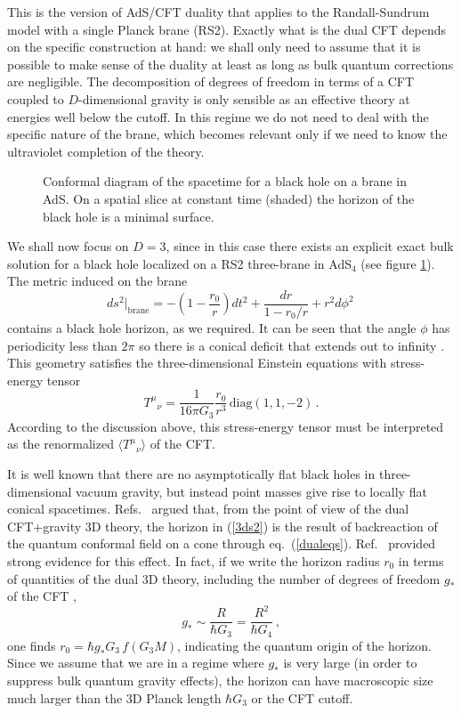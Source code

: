 \documentclass[12pt]{article}
\newcommand{\beq}{\begin{equation}}
\newcommand{\eeq}{\end{equation}}
\newcommand{\reef}[1]{(\ref{#1})}
\begin{document}
This is the version of AdS/CFT duality that applies to the
Randall-Sundrum model with a single Planck brane (RS2). Exactly what is
the dual CFT depends on the specific construction at hand: we shall only
need to assume that it is possible to make sense of the duality at least
as long as bulk quantum corrections are negligible. The decomposition of
degrees of freedom in terms of a CFT coupled to $D$-dimensional gravity
is only sensible as an effective theory at energies well below the
cutoff. In this regime we do not need to deal with the specific nature
of the brane, which becomes relevant only if we need to know the
ultraviolet completion of the theory.

\begin{figure}%
\begin{center}\leavevmode  %
\epsfxsize=7cm 
\end{center}
\caption{\small Conformal diagram of the spacetime for a black hole on a
brane in AdS. On a spatial slice at constant time (shaded) the horizon
of the black hole is a minimal surface.
}
\label{fig:rs2bh}
\end{figure}

We shall now focus on $D=3$, since in this case there exists an explicit
exact bulk solution for a black hole localized on a RS2 three-brane in
AdS$_4$ \cite{ehm1} (see figure \ref{fig:rs2bh}). The metric induced on
the brane
\beq\label{3ds2}
ds^2|_\mathrm{brane}=-\left(1-\frac{r_0}{r}\right)dt^2+\frac{dr}{1-r_0/r}
+r^2d\phi^2\,
\eeq
contains a black hole horizon, as we
required. It can be seen that the angle $\phi$ has periodicity less than
$2\pi$ so there is a conical deficit that extends out to infinity
\cite{ehm1}. This geometry satisfies the three-dimensional Einstein
equations with stress-energy tensor
\beq\label{tmunu}
{T^\mu}_\nu=\frac{1}{16\pi G_{3}}\frac{r_0}{r^3}\,\mathrm{diag}(1,1,-2)\,.
\eeq
According to the discussion above, this stress-energy tensor must be
interpreted as the renormalized $\langle {T^\mu}_\nu\rangle$ of the CFT.

It is well known that there are no asymptotically flat black holes in
three-dimensional vacuum gravity, but instead point masses give rise to
locally flat conical spacetimes. Refs.~\cite{tanaka,efk} argued that, from the
point of view of the dual CFT+gravity 3D theory, the horizon in
\reef{3ds2} is the result of backreaction of the quantum conformal field
on a cone through eq.~\reef{dualeqs}. Ref.~\cite{efk} provided strong
evidence for this effect. In fact, if we write the horizon radius $r_0$
in terms of quantities of the dual 3D theory, including the
number of degrees of freedom $g_*$ of the CFT ,
\beq\label{gstar}
g_*\sim \frac{R}{\hbar G_3}=\frac{R^2}{\hbar G_4}\,,
\eeq
one finds $r_0=\hbar g_* G_3\, f(G_3M)$, indicating the quantum origin
of the horizon. Since we assume that we are in a regime where
$g_*$ is very large (in order to suppress bulk quantum gravity effects),
the horizon can have macroscopic size much larger than the 3D Planck
length $\hbar G_3$ or the CFT cutoff. 
\end{document}
